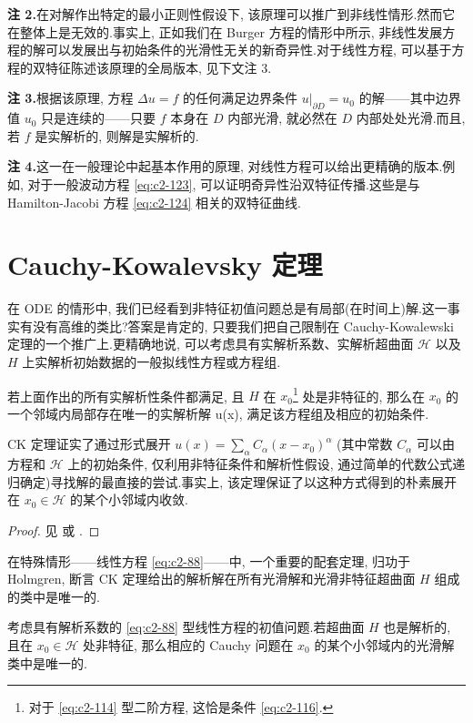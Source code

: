 \noindent\textbf{注 2.}\quad 在对解作出特定的最小正则性假设下, 该原理可以推广到非线性情形.然而它在整体上是无效的.事实上, 正如我们在 Burger 方程的情形中所示, 非线性发展方程的解可以发展出与初始条件的光滑性无关的新奇异性.对于线性方程, 可以基于方程的双特征陈述该原理的全局版本, 见下文注 3.

\noindent\textbf{注 3.}\quad 根据该原理, 方程 $\Delta u = f$ 的任何满足边界条件 $u|_{\partial D} = u_{0}$ 的解——其中边界值 $u_{0}$ 只是连续的——只要 $f$ 本身在 $D$ 内部光滑, 就必然在 $D$ 内部处处光滑.而且, 若 $f$ 是实解析的, 则解是实解析的.

\noindent\textbf{注 4.}\quad 这一在一般理论中起基本作用的原理, 对线性方程可以给出更精确的版本.例如, 对于一般波动方程 \eqref{eq:c2-123}, 可以证明奇异性沿双特征传播.这些是与 Hamilton-Jacobi 方程 \eqref{eq:c2-124} 相关的双特征曲线.

\section{Cauchy-Kowalevsky 定理}

在 ODE 的情形中, 我们已经看到非特征初值问题总是有局部(在时间上)解.这一事实有没有高维的类比?答案是肯定的, 只要我们把自己限制在 Cauchy-Kowalewski 定理的一个推广上.更精确地说, 可以考虑具有实解析系数、实解析超曲面 $\mathcal{H}$ 以及 $H$ 上实解析初始数据的一般拟线性方程或方程组.

\begin{theorem*}
若上面作出的所有实解析性条件都满足, 且 $H$ 在 $x_{0}$\footnote{对于 \eqref{eq:c2-114} 型二阶方程, 这恰是条件 \eqref{eq:c2-116}.} 处是非特征的, 那么在 $x_{0}$ 的一个邻域内局部存在唯一的实解析解 u(x), 满足该方程组及相应的初始条件.
\end{theorem*}

CK 定理证实了通过形式展开
$u(x) = \sum_{\alpha} C_{\alpha} (x - x_{0})^{\alpha}$
(其中常数 $C_{\alpha}$ 可以由方程和 $\mathcal{H}$ 上的初始条件, 仅利用非特征条件和解析性假设, 通过简单的代数公式递归确定)寻找解的最直接的尝试.事实上, 该定理保证了以这种方式得到的朴素展开在 $x_{0} \in \mathcal{H}$ 的某个小邻域内收敛.

\begin{proof}
见 \cite{e} 或 \cite{j}.
\end{proof}

在特殊情形——线性方程 \eqref{eq:c2-88}——中, 一个重要的配套定理, 归功于 Holmgren, 断言 CK 定理给出的解析解在所有光滑解和光滑非特征超曲面 $H$ 组成的类中是唯一的.

\begin{theorem}\label{thm:c2-4.1}
考虑具有解析系数的 \eqref{eq:c2-88} 型线性方程的初值问题.若超曲面 $H$ 也是解析的, 且在 $x_{0} \in \mathcal{H}$ 处非特征, 那么相应的 Cauchy 问题在 $x_{0}$ 的某个小邻域内的光滑解类中是唯一的.
\end{theorem}

